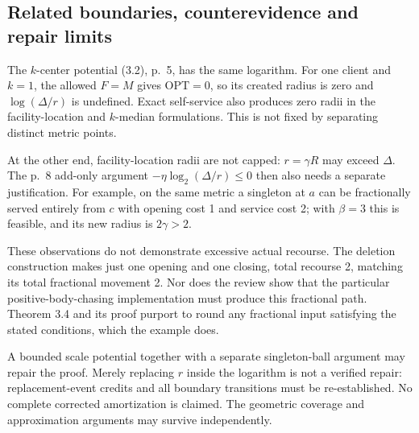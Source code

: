 \documentclass[10pt]{article}
\begin{document}
\subsection*{Related boundaries, counterevidence and repair limits}
The \(k\)-center potential (3.2), p. 5, has the same logarithm. For one client and \(k=1\), the allowed \(F=M\) gives \(\mathrm{OPT}=0\), so its created radius is zero and \(\log(\Delta/r)\) is undefined. Exact self-service also produces zero radii in the facility-location and \(k\)-median formulations. This is not fixed by separating distinct metric points.\par
At the other end, facility-location radii are not capped: \(r=\gamma R\) may exceed \(\Delta\). The p. 8 add-only argument \(-\eta\log_2(\Delta/r)\le0\) then also needs a separate justification. For example, on the same metric a singleton at \(a\) can be fractionally served entirely from \(c\) with opening cost 1 and service cost 2; with \(\beta=3\) this is feasible, and its new radius is \(2\gamma>2\).\par
These observations do not demonstrate excessive actual recourse. The deletion construction makes just one opening and one closing, total recourse 2, matching its total fractional movement 2. Nor does the review show that the particular positive-body-chasing implementation must produce this fractional path. Theorem 3.4 and its proof purport to round any fractional input satisfying the stated conditions, which the example does.\par
A bounded scale potential together with a separate singleton-ball argument may repair the proof. Merely replacing \(r\) inside the logarithm is not a verified repair: replacement-event credits and all boundary transitions must be re-established. No complete corrected amortization is claimed. The geometric coverage and approximation arguments may survive independently.\par
\end{document}

